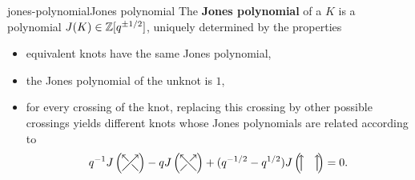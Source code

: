 \begin{topic}{jones-polynomial}{Jones polynomial}
    The \textbf{Jones polynomial} of a  $K$ is a polynomial $J(K) \in \mathbb{Z}[q^{\pm 1/2}]$, uniquely determined by the properties
    \begin{itemize}
        \item equivalent knots have the same Jones polynomial,
        \item the Jones polynomial of the unknot is $1$,
        \item for every crossing of the knot, replacing this crossing by other possible crossings yields different knots whose Jones polynomials are related according to
        \[ q^{-1} J \left( \begin{tikzpicture}[semithick, scale=0.5, baseline=1ex] 
            \draw [-to] (0, 0) -- (1, 1);
            \draw (1, 0) -- (0.6, 0.4);
            \draw [-to] (0.4, 0.6) -- (0, 1);
        \end{tikzpicture} \right) - q J \left( \begin{tikzpicture}[semithick, scale=0.5, baseline=1ex]
            \draw (0, 0) -- (0.4, 0.4);
            \draw [-to] (0.6, 0.6) -- (1, 1);
            \draw [-to] (1, 0) -- (0, 1);
        \end{tikzpicture} \right) + (q^{-1/2} - q^{1/2}) J \left( \begin{tikzpicture}[semithick, scale=0.5, baseline=1ex]
            \draw [-to] (0, 0) -- (0, 1);
            \draw [-to] (1, 0) -- (1, 1);
        \end{tikzpicture} \right) = 0 . \]
    \end{itemize}
\end{topic}

